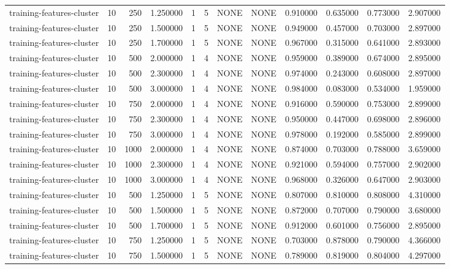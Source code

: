 \begin{tabular}{lrrrllllrrrr}
training-features-cluster & 10 & 250 & 1.250000 & 1 & 5 & NONE & NONE & 0.910000 & 0.635000 & 0.773000 & 2.907000 \\
training-features-cluster & 10 & 250 & 1.500000 & 1 & 5 & NONE & NONE & 0.949000 & 0.457000 & 0.703000 & 2.897000 \\
training-features-cluster & 10 & 250 & 1.700000 & 1 & 5 & NONE & NONE & 0.967000 & 0.315000 & 0.641000 & 2.893000 \\
training-features-cluster & 10 & 500 & 2.000000 & 1 & 4 & NONE & NONE & 0.959000 & 0.389000 & 0.674000 & 2.895000 \\
training-features-cluster & 10 & 500 & 2.300000 & 1 & 4 & NONE & NONE & 0.974000 & 0.243000 & 0.608000 & 2.897000 \\
training-features-cluster & 10 & 500 & 3.000000 & 1 & 4 & NONE & NONE & 0.984000 & 0.083000 & 0.534000 & 1.959000 \\
training-features-cluster & 10 & 750 & 2.000000 & 1 & 4 & NONE & NONE & 0.916000 & 0.590000 & 0.753000 & 2.899000 \\
training-features-cluster & 10 & 750 & 2.300000 & 1 & 4 & NONE & NONE & 0.950000 & 0.447000 & 0.698000 & 2.896000 \\
training-features-cluster & 10 & 750 & 3.000000 & 1 & 4 & NONE & NONE & 0.978000 & 0.192000 & 0.585000 & 2.899000 \\
training-features-cluster & 10 & 1000 & 2.000000 & 1 & 4 & NONE & NONE & 0.874000 & 0.703000 & 0.788000 & 3.659000 \\
training-features-cluster & 10 & 1000 & 2.300000 & 1 & 4 & NONE & NONE & 0.921000 & 0.594000 & 0.757000 & 2.902000 \\
training-features-cluster & 10 & 1000 & 3.000000 & 1 & 4 & NONE & NONE & 0.968000 & 0.326000 & 0.647000 & 2.903000 \\
training-features-cluster & 10 & 500 & 1.250000 & 1 & 5 & NONE & NONE & 0.807000 & 0.810000 & 0.808000 & 4.310000 \\
training-features-cluster & 10 & 500 & 1.500000 & 1 & 5 & NONE & NONE & 0.872000 & 0.707000 & 0.790000 & 3.680000 \\
training-features-cluster & 10 & 500 & 1.700000 & 1 & 5 & NONE & NONE & 0.912000 & 0.601000 & 0.756000 & 2.895000 \\
training-features-cluster & 10 & 750 & 1.250000 & 1 & 5 & NONE & NONE & 0.703000 & 0.878000 & 0.790000 & 4.366000 \\
training-features-cluster & 10 & 750 & 1.500000 & 1 & 5 & NONE & NONE & 0.789000 & 0.819000 & 0.804000 & 4.297000 \\

\end{tabular}
